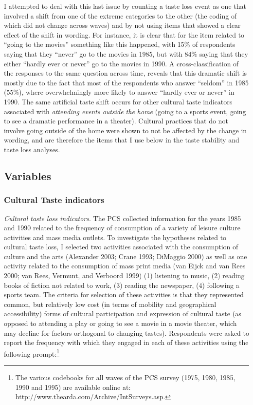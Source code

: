 I attempted to deal with this last issue by counting a taste loss event as one that involved a shift from one of the extreme categories to the other (the coding of which did not change across waves) and by not using items that showed a clear effect of the shift in wording. For instance, it is clear that for the item related to ``going to the movies'' something like this happened, with 15\% of respondents saying that they ``never'' go to the movies in 1985, but with 84\% saying that they either ``hardly ever or never'' go to the movies in 1990. A cross-classification of the responses to the same question across time, reveals that this dramatic shift is mostly due to the fact that most of the respondents who answer ``seldom'' in 1985 (55\%), where overwhelmingly more likely to answer ``hardly ever or never'' in 1990. The same artificial taste shift occurs for other cultural taste indicators associated with \emph{attending events outside the home} (going to a sports event, going to see a dramatic performance in a theater). Cultural practices that do not involve going outside of the home were shown to not be affected by the change in wording, and are therefore the items that I use below in the taste stability and taste loss analyses.

\subsection{\texorpdfstring{Variables }{Variables }}\label{variables}

\subsubsection{Cultural Taste indicators}\label{cultural-taste-indicators}

\emph{Cultural taste loss indicators}. The PCS collected information for the years 1985 and 1990 related to the frequency of consumption of a variety of leisure culture activities and mass media outlets. To investigate the hypotheses related to cultural taste loss, I selected two activities associated with the consumption of culture and the arts (Alexander 2003; Crane 1993; DiMaggio 2000) as well as one activity related to the consumption of mass print media (van Eijck and van Rees 2000; van Rees, Vermunt, and Verboord 1999) (1) listening to music, (2) reading books of fiction not related to work, (3) reading the newspaper, (4) following a sports team. The criteria for selection of these activities is that they represented common, but relatively low cost (in terms of mobility and geographical accessibility) forms of cultural participation and expression of cultural taste (as opposed to attending a play or going to see a movie in a movie theater, which may decline for factors orthogonal to changing tastes). Respondents were asked to report the frequency with which they engaged in each of these activities using the following prompt:\footnote{The various codebooks for all waves of the PCS survey (1975, 1980, 1985, 1990 and 1995) are available online at: http://www.thearda.com/Archive/IntSurveys.asp.}

